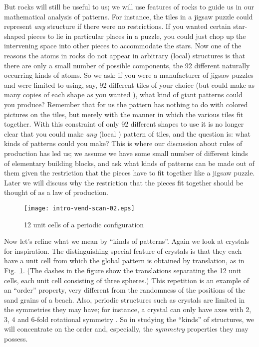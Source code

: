 \documentclass[reqno]{stml-l}
\theoremstyle{plain}
\theoremstyle{definition}
\numberwithin{equation}{chapter}
\begin{document}
But rocks will still be useful to us; we will use features
of rocks to guide us in our mathematical analysis of
patterns. For instance, the tiles in a jigsaw puzzle could
represent \emph{any} structure if there were no
restrictions. If you wanted certain star-shaped pieces to
lie in particular places in a puzzle, you could just chop
up the intervening space into other pieces to accommodate
the stars. Now one of the reasons the atoms in rocks do not
appear in arbitrary (local) structures is that there are
only a small number of possible components, the 92
different naturally occurring kinds of atoms. So we ask: if
you were a manufacturer of jigsaw puzzles and were limited
to using, say, 92 different tiles of your choice (but could
make as many copies of each shape as you wanted ), what
kind of giant patterns could you produce? Remember that for
us the pattern has nothing to do with colored pictures on
the tiles, but merely with the manner in which the various
tiles fit together. With this constraint of only 92
different shapes to use it is no longer clear that you
could make \emph{any} (local ) pattern of tiles, and the
question is: what kinds of patterns could you make? This is
where our discussion about rules of production has led us;
we assume we have some small number of different kinds of
elementary building blocks, and ask what kinds of patterns
can be made out of them given the restriction that the
pieces have to fit together like a jigsaw puzzle. Later we
will discuss why the restriction that the pieces fit
together should be thought of as a law of production.

\begin{figure}[h]
\texttt{[image: intro-vend-scan-02.eps]}
\caption{12 unit cells of a periodic
configuration}
\label{Intro:fig2}
\end{figure}


Now let's refine what we mean by ``kinds of patterns''.
Again we look at crystals for inspiration. The
distinguishing special feature of crystals is that they
each have a unit cell from which the global pattern is
obtained by translation, as in Fig.~\ref{Intro:fig2}. (The
dashes in the figure show the translations separating the
12 unit cells, each unit cell consisting of three spheres.)
This repetition is an example of an ``order'' property,
very different from the randomness of the positions of the
sand grains of a beach. Also,
periodic structures such as
crystals are limited in the symmetries they may have; for
instance, a crystal can only have axes with 2, 3, 4 and
6-fold rotational symmetry \cite[p. 84]{bib:HiC}. So in
studying the ``kinds'' of structures, we will concentrate
on the order and, especially, the \emph{symmetry}
properties they may possess.
\end{document}

